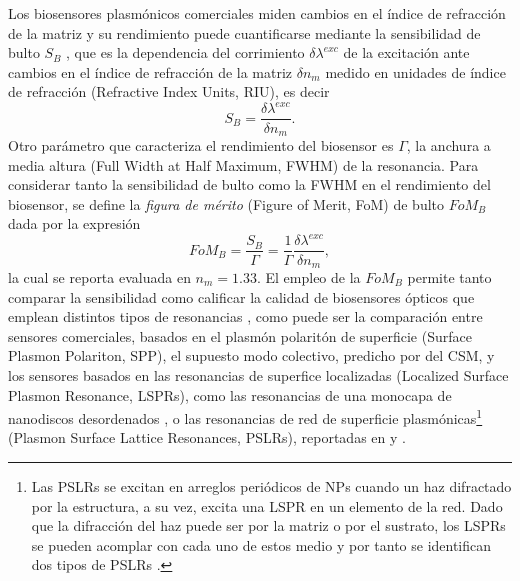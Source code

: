 Los biosensores plasmónicos comerciales miden cambios en el índice de refracción de la matriz y su rendimiento puede cuantificarse mediante la sensibilidad de bulto $S_B$ \cite{estevez2014trends,svedendahl2009refractometric}, que es la dependencia del corrimiento $\delta \lambda^{exc}$ de la excitación ante cambios en el índice de refracción de la matriz $\delta n_m$ medido en unidades de índice de refracción (Refractive Index Units, RIU), es decir
%
	\begin{equation}
	S_B = \frac{\delta \lambda^{exc}}{\delta n_m}.
	\label{eq:SBulk}
	\end{equation}
%
Otro parámetro que caracteriza el rendimiento del biosensor es $\Gamma$, la anchura a media altura (Full Width at Half Maximum, FWHM) de la resonancia. Para considerar tanto la sensibilidad de bulto como la FWHM en el rendimiento del biosensor, se define la \emph{figura de mérito} (Figure of Merit, FoM) de bulto  $\textit{FoM}_B$ dada por la expresión
%
	\begin{equation}
	\textit{FoM}_B = \frac{S_B}{\Gamma}
			=\frac{1}{\Gamma}\frac{\delta \lambda^{exc}}{\delta n_m},
	\label{eq:FoM}
	\end{equation}
%
la cual se reporta evaluada en $n_m=1.33$. El empleo de la $\textit{FoM}_B$ permite tanto comparar la sensibilidad como calificar la calidad de biosensores ópticos que emplean distintos tipos de resonancias \cite{danilov2018ultra,svedendahl2009refractometric}, como puede ser la comparación entre sensores comerciales, basados en el plasmón polaritón de superficie (Surface Plasmon Polariton, SPP), el supuesto modo colectivo, predicho por del CSM, y los sensores basados en las resonancias de superfice localizadas (Localized Surface Plasmon Resonance, LSPRs), como las resonancias de una monocapa de nanodiscos desordenados \cite{svedendahl2009refractometric}, o las resonancias de red de superficie plasmónicas\footnote{Las PSLRs se excitan en arreglos periódicos de NPs cuando un haz difractado por la estructura, a su vez, excita una LSPR en un elemento de la red. Dado que la difracción del haz puede ser por la matriz o por el sustrato, los LSPRs se pueden acomplar con cada uno de estos medio y por tanto se identifican dos tipos de PSLRs \cite{danilov2018ultra}.} (Plasmon Surface Lattice Resonances, PSLRs), reportadas en \cite{kabashin2009plasmonic} y \cite{danilov2018ultra}.

